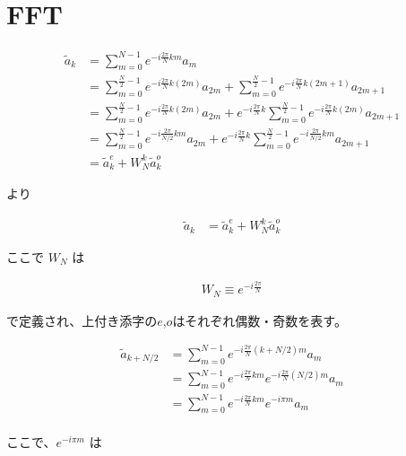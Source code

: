 \section{FFT}


\begin{align*}
    \tilde{a}_k &= \sum_{m = 0}^{N - 1} e^{-i\frac{2\pi}{N} km} a_m \\
                &= \sum_{m = 0}^{\frac{N}{2} - 1} e^{-i\frac{2\pi}{N} k(2m)} a_{2m} 
                   + \sum_{m = 0}^{\frac{N}{2} - 1} e^{-i\frac{2\pi}{N} k(2m + 1)} a_{2m + 1} \\ 
                &= \sum_{m = 0}^{\frac{N}{2} - 1} e^{-i\frac{2\pi}{N} k(2m)} a_{2m} 
                   + e^{-i\frac{2\pi}{N}k} \sum_{m = 0}^{\frac{N}{2} - 1} e^{-i\frac{2\pi}{N} k(2m)} a_{2m + 1} \\ 
                &= \sum_{m = 0}^{\frac{N}{2} - 1} e^{-i\frac{2\pi}{N/2} km} a_{2m} 
                   + e^{-i\frac{2\pi}{N}k} \sum_{m = 0}^{\frac{N}{2} - 1} e^{-i\frac{2\pi}{N/2} km} a_{2m + 1} \\ 
                &= \tilde{a}_k^{e} + W_N^{k} \tilde{a}_k^{o}
\end{align*}

より

\begin{align}
    \tilde{a}_k &= \tilde{a}_k^{e} + W_N^{k} \tilde{a}_k^{o}
\end{align}

ここで $W_N$ は

\begin{align*}
    W_N \equiv e^{-i\frac{2\pi}{N}} 
\end{align*}

で定義され、上付き添字の$e$,$o$はそれぞれ偶数・奇数を表す。


\begin{align*}
    \tilde{a}_{k + N/2} &= \sum_{m = 0}^{N - 1} e^{-i\frac{2\pi}{N} (k + N/2)m} a_m \\
                        &= \sum_{m = 0}^{N - 1} e^{-i\frac{2\pi}{N}km} e^{-i\frac{2\pi}{N}(N/2)m}  a_m \\
                        &= \sum_{m = 0}^{N - 1} e^{-i\frac{2\pi}{N}km} e^{-i\pi m}  a_m \\
\end{align*}

ここで、$e^{-i\pi m}$ は

